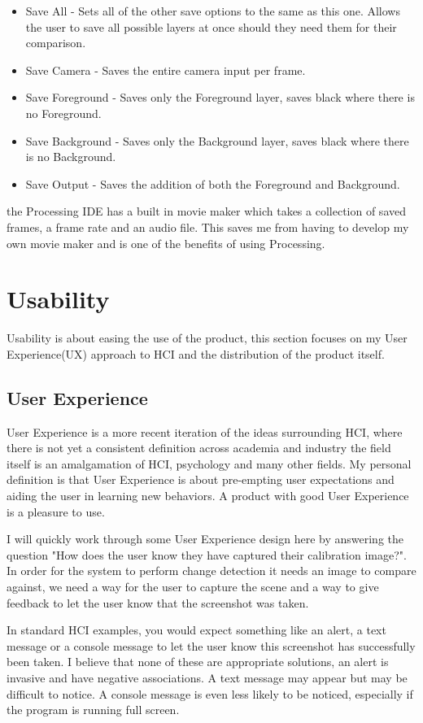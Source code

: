 \documentclass[a4paper]{report}
\begin{document}
\begin{itemize}
\item Save All - Sets all of the other save options to the same as this one. Allows the user to save all possible layers at once should they need them for their comparison.
\item Save Camera - Saves the entire camera input per frame.
\item Save Foreground - Saves only the Foreground layer, saves black where there is no Foreground.
\item Save Background - Saves only the Background layer, saves black where there is no Background.
\item Save Output - Saves the addition of both the Foreground and Background.
\end{itemize}

the Processing IDE\cite{PROCESSING} has a built in movie maker which takes a collection of saved frames, a frame rate and an audio file. This saves me from having to develop my own movie maker and is one of the benefits of using Processing.

\section{Usability}
Usability is about easing the use of the product, this section focuses on my User Experience(UX) approach to HCI and the distribution of the product itself.

\subsection{User Experience}
User Experience is a more recent iteration of the ideas surrounding HCI, where there is not yet a consistent definition across academia and industry the field itself is an amalgamation of HCI, psychology and many other fields. My personal definition is that User Experience is about pre-empting user expectations and aiding the user in learning new behaviors. A product with good User Experience is a pleasure to use. 

I will quickly work through some User Experience design here by answering the question "How does the user know they have captured their calibration image?". In order for the system to perform change detection it needs an image to compare against, we need a way for the user to capture the scene and a way to give feedback to let the user know that the screenshot was taken.

In standard HCI examples, you would expect something like an alert, a text message or a console message to let the user know this screenshot has successfully been taken. I believe that none of these are appropriate solutions, an alert is invasive and have negative associations. A text message may appear but may be difficult to notice. A console message is even less likely to be noticed, especially if the program is running full screen.
\end{document}
